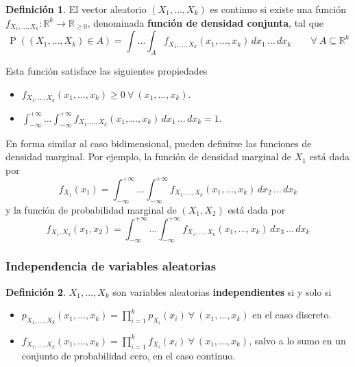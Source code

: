 \documentclass[11pt]{article}
\theoremstyle{plain}
\theoremstyle{definition}
\newtheorem*{defi}{Definición}
\theoremstyle{remark}
\newcommand{\deft}[1]{\textbf{#1}}  %
\newcommand{\proba}{\ensuremath{\operatorname{P}}}  %
\newcommand{\foralle}{\ensuremath{\forall \ }}  %
\begin{document}
      \begin{defi}
        El vector aleatorio $(X_1,\dots,X_k)$ es continuo si existe una función $f_{X_1,\dots,X_k} : \mathbb{R}^k \to \mathbb{R}_{\geq 0}$, denominada \deft{función de densidad conjunta}, tal que
        \[ \proba((X_1,\dots,X_k) \in A) = \int\dots\int_A f_{X_1,\dots,X_k}(x_1,\dots,x_k) \,dx_1 \,\dots \,dx_k \qquad \foralle A \subseteq \mathbb{R}^k\]
      \end{defi}

      Esta función satisface las siguientes propiedades
      \begin{itemize}
        \item $f_{X_1, \dots, X_k} (x_1, \dots, x_k) \geq 0 \ \foralle (x_1, \dots, x_k)$.
        \item $\int_{-\infty}^{+\infty} \dots \int_{-\infty}^{+\infty} f_{X_1, \dots, X_k} (x_1, \dots, x_k) \,dx_1 \,\dots \,dx_k = 1$.
      \end{itemize}

      En forma similar al caso bidimensional, pueden definirse las funciones de densidad marginal. Por ejemplo, la función de densidad marginal de $X_1$ está dada por
      \[ f_{X_1}(x_1) = \int_{-\infty}^{+\infty} \dots \int_{-\infty}^{+\infty} f_{X_1, \dots, X_k} (x_1, \dots, x_k) \,dx_2 \,\dots \,dx_k \]
      y la función de probabilidad marginal de $(X_1,X_2)$ está dada por
      \[ f_{X_1,X_2}(x_1,x_2) = \int_{-\infty}^{+\infty} \dots \int_{-\infty}^{+\infty} f_{X_1, \dots, X_k} (x_1, \dots, x_k) \,dx_3 \,\dots \,dx_k \]

    \subsubsection{Independencia de variables aleatorias}

      \begin{defi}
        $X_1,\dots,X_k$ son variables aleatorias \deft{independientes} si y solo si
        \begin{itemize}
          \item $p_{X_1,\dots,X_k}(x_1,\dots,x_k) = \prod_{i=1}^k p_{X_i}(x_i) \ \foralle (x_1,\dots,x_k)$ en el caso discreto.
          \item $f_{X_1,\dots,X_k}(x_1,\dots,x_k) = \prod_{i=1}^k f_{X_i}(x_i) \ \foralle (x_1,\dots,x_k)$, salvo a lo sumo en un conjunto de probabilidad cero, en el caso continuo.
        \end{itemize}
      \end{defi}
\end{document}
